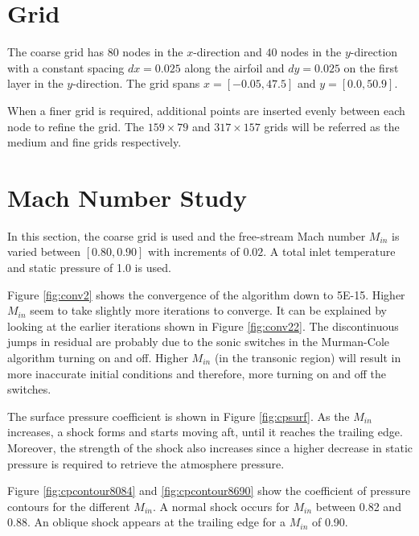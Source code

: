 \documentclass[letterpaper,12pt,]{article}
\begin{document}



\section*{Grid}

The coarse grid has $80$ nodes in the $x$-direction and $40$ nodes in the $y$-direction with a constant spacing $dx = 0.025$ along the airfoil and $dy=0.025$ on the first layer in the $y$-direction.
The grid spans $x=[-0.05, 47.5]$ and $y=[0.0, 50.9]$.

When a finer grid is required, additional points are inserted evenly between each node to refine the grid.
The $159 \times 79$ and $317 \times 157$ grids will be referred as the medium and fine grids respectively.

\section*{Mach Number Study}

In this section, the coarse grid is used and the free-stream Mach number $M_{in}$ is varied between $[0.80,0.90]$ with increments of $0.02$.
A total inlet temperature and static pressure of 1.0 is used.

Figure \ref{fig:conv2} shows the convergence of the algorithm down to 5\textsc{E-}15.
Higher $M_{in}$ seem to take slightly more iterations to converge.
It can be explained by looking at the earlier iterations shown in Figure \ref{fig:conv22}.
The discontinuous jumps in residual are probably due to the sonic switches in the Murman-Cole algorithm turning on and off.
Higher $M_{in}$ (in the transonic region) will result in more inaccurate initial conditions and therefore, more turning on and off the switches.

The surface pressure coefficient is shown in Figure \ref{fig:cpsurf}.
As the $M_{in}$ increases, a shock forms and starts moving aft, until it reaches the trailing edge.
Moreover, the strength of the shock also increases since a higher decrease in static pressure is required to retrieve the atmosphere pressure.

Figure \ref{fig:cpcontour8084} and \ref{fig:cpcontour8690} show the coefficient of pressure contours for the different $M_{in}$.
A normal shock occurs for $M_{in}$ between 0.82 and 0.88.
An oblique shock appears at the trailing edge for a $M_{in}$ of 0.90.
\end{document}
